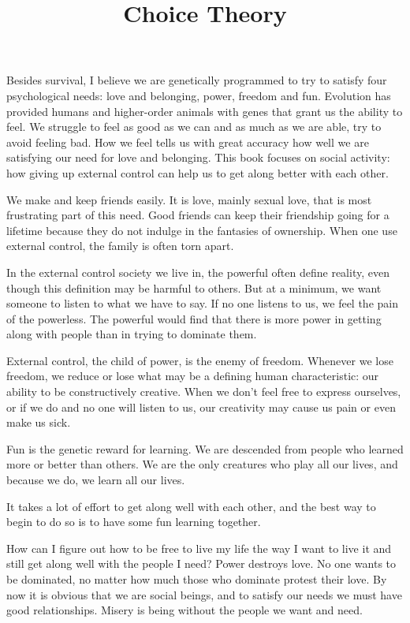 \documentclass[ebook,12pt,oneside,openany]{memoir}
\begin{document}
\title{Choice Theory}
\maketitle

Besides survival, I believe we are genetically programmed to try to satisfy four psychological needs: love and belonging, power, freedom and fun.
Evolution has provided humans and higher-order animals with genes that grant us the ability to feel.
We struggle to feel as good as we can and as much as we are able, try to avoid feeling bad.
How we feel tells us with great accuracy how well we are satisfying our need for love and belonging.
This book focuses on social activity: how giving up external control can help us to get along better with each other.

We make and keep friends easily. It is love, mainly sexual love, that is most frustrating part of this need.
Good friends can keep their friendship going for a lifetime because they do not indulge in the fantasies of ownership.
When one use external control, the family is often torn apart.

In the external control society we live in, the powerful often define reality, even though this definition may be harmful to others.
But at a minimum, we want someone to listen to what we have to say. If no one listens to us, we feel the pain of the powerless.
The powerful would find that there is more power in getting along with people than in trying to dominate them.

External control, the child of power, is the enemy of freedom. Whenever we lose freedom, we reduce or lose what may be a defining human characteristic:
our ability to be constructively creative. When we don't feel free to express ourselves, or if we do and no one will listen to us, our creativity may cause us pain or even make us sick.

Fun is the genetic reward for learning. We are descended from people who learned more or better than others.
We are the only creatures who play all our lives, and because we do, we learn all our lives. 

It takes a lot of effort to get along well with each other, and the best way to begin to do so is to have some fun learning together.

How can I figure out how to be free to live my life the way I want to live it and still get along well with the people I need?
Power destroys love. No one wants to be dominated, no matter how much those who dominate protest their love. 
By now it is obvious that we are social beings, and to satisfy our needs we must have good relationships. Misery is being without the people we want and need.
\end{document}
